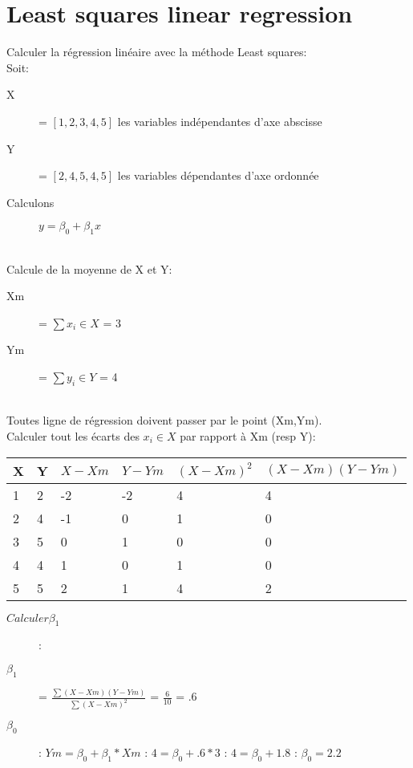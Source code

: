 \pagebreak
\section{Least squares linear regression}
Calculer la régression linéaire avec la méthode Least squares:\\
Soit:
\begin{description}
\item[X] = $[1,2,3,4,5]$ les variables indépendantes d'axe abscisse
\item[Y] = $[2,4,5,4,5]$ les variables dépendantes d'axe ordonnée
\item[Calculons] $y = \beta_0 + \beta_1 x$
\end{description}
\ \\
Calcule de la moyenne de X et Y:
\begin{description}
\item[Xm] = $ \sum x_i \in X$ = 3
\item[Ym] = $ \sum y_i \in Y$ = 4
\end{description}
\ \\
Toutes ligne de régression doivent passer par le point (Xm,Ym).\\
Calculer tout les écarts des $x_i \in X$ par rapport à Xm (resp Y):\\

\begin{tabular}{ll|l|l|l|l}
  \hline
  X  & Y & $X - Xm$ & $Y - Ym$ & $(X-Xm)^2$ & $(X-Xm)(Y-Ym)$\\
  \hline
  1 & 2 & -2 & -2 & 4 & 4\\
  2 & 4 & -1 & 0  & 1 & 0\\
  3 & 5 & 0  & 1  & 0 & 0\\
  4 & 4 & 1  & 0  & 1 & 0\\
  5 & 5 & 2  & 1  & 4 & 2\\ 
  \hline
\end{tabular}

\begin{description}
\item[$Calculer \beta_1$]:
\item[$ \beta_1 $] = $ \frac{ \sum (X-Xm)(Y-Ym)}{ \sum (X-Xm)^2}$ = $\frac{6}{10}$ = $.6$
\item[$ \beta_0 $]: $Ym = \beta_0 + \beta_1 * Xm$ : $4 = \beta_0 + .6 * 3$ : $4= \beta_0 + 1.8$ : $\beta_0 = 2.2$
\end{description}
\pagebreak
